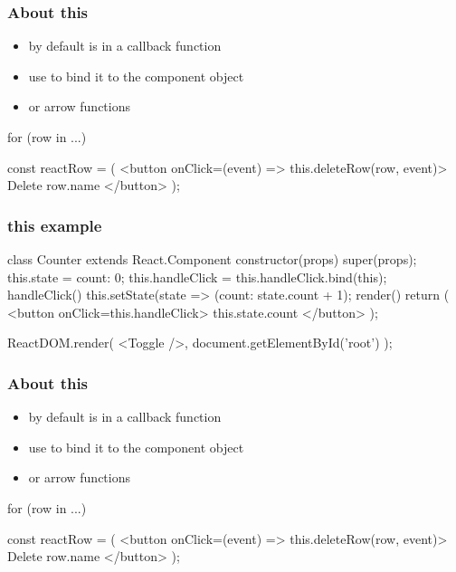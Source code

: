 \begin{frame}[fragile] \frametitle{About this}
\begin{itemize}
  \item by default  is  in a callback function
  \item use  to bind it to the component object
  \item or arrow functions
\end{itemize}
\begin{CodeBox}{}
for (row in ...) {

  const reactRow = (
    <button onClick={(event) => this.deleteRow(row, event)}>
      Delete {row.name}
    </button>
  );
  
}
\end{CodeBox}
\end{frame}
\begin{frame}[fragile] \frametitle{this example}
\begin{CodeBox}{}
class Counter extends React.Component {
  constructor(props) {
    super(props);
    this.state = {count: 0};
    this.handleClick = this.handleClick.bind(this);
  }
  handleClick() {
    this.setState(state => ({count: state.count + 1});
  }
  render() {
    return (
      <button onClick={this.handleClick}>
        {this.state.count}
      </button>
    );
  }
}

ReactDOM.render(
  <Toggle />,
  document.getElementById('root')
);
\end{CodeBox}
\end{frame}

\begin{frame}[fragile] \frametitle{About this}
\begin{itemize}
  \item by default  is  in a callback function
  \item use  to bind it to the component object
  \item or arrow functions
\end{itemize}
\begin{CodeBox}{}
for (row in ...) {

  const reactRow = (
    <button onClick={(event) => this.deleteRow(row, event)}>
      Delete {row.name}
    </button>
  );
  
}
\end{CodeBox}
\end{frame}

